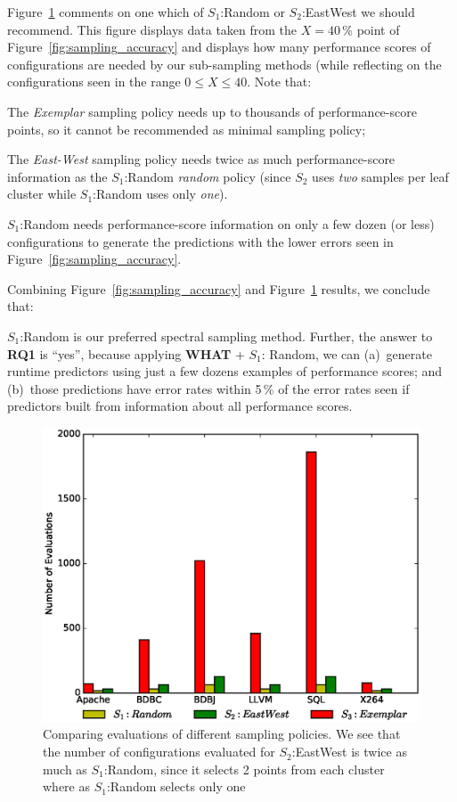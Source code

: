 \documentclass{sig-alternative}
\newcommand{\fig}[1]{Figure~\ref{fig:#1}}
\newcommand{\what}{{\bf WHAT }}
\begin{document}
\fig{Evaluations} comments on one which  of    $S_1$:Random or $S_2$:EastWest we should recommend.
This figure displays data taken from the $X=40$\,\% point of \fig{sampling_accuracy} and displays
how many performance scores of configurations are needed by our sub-sampling methods (while
reflecting on the configurations seen in the range $0\le X \le 40$. Note that:
\begin{compactitem}
\item
The {\em Exemplar} sampling policy needs up to thousands of performance-score points, 
so it cannot be recommended as minimal sampling policy;
\item The {\em East-West} sampling policy needs twice as much performance-score information as 
the $S_1$:Random {\em random} policy (since $S_2$ uses {\em two} samples per leaf cluster  while
$S_1$:Random uses only {\em one}).
\item $S_1$:Random needs performance-score information on only a few dozen (or less) configurations to generate
the predictions with the lower errors seen in \fig{sampling_accuracy}.
\end{compactitem}
Combining \fig{sampling_accuracy} and \fig{Evaluations} results, we conclude that:

\begin{myshadowbox}
$S_1$:Random is our preferred spectral sampling method. Further,
the answer to {\bf RQ1} is ``yes'', because applying \what + $S_1$: Random, we can (a)~generate runtime predictors
using just a few dozens examples of performance scores; and (b)~those predictions have error rates
within 5\,\% of the error rates seen if predictors built from information about all performance scores.
\end{myshadowbox}

\begin{figure}[!t]
\includegraphics[width=0.9\linewidth]{Figures/evaluation_graph.eps}
\caption{ Comparing evaluations of different sampling policies. We see that the number of configurations evaluated for $S_2$:EastWest is twice as much as $S_1$:Random, since it selects 2 points from each cluster where as  $S_1$:Random selects only one }\label{fig:Evaluations}
\end{figure}
\end{document}
